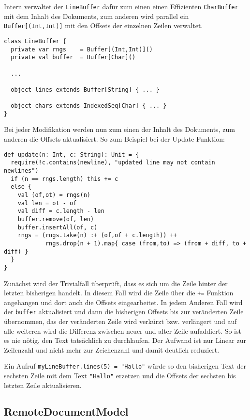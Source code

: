 Intern verwaltet der \texttt{LineBuffer} dafür zum einen einen Effizienten \texttt{CharBuffer} mit
dem Inhalt des Dokuments, zum anderen wird parallel ein \texttt{Buffer[(Int,Int)]} mit den Offsets
der einzelnen Zeilen verwaltet.

\begin{lstlisting}
class LineBuffer {
  private var rngs    = Buffer[(Int,Int)]()  
  private val buffer  = Buffer[Char]()     

  ...
    
  object lines extends Buffer[String] { ... } 
  
  object chars extends IndexedSeq[Char] { ... } 
}
\end{lstlisting}

Bei jeder Modifikation werden nun zum einen der Inhalt des Dokuments, zum anderen die Offsets
aktualisiert. So zum Beispiel bei der Update Funktion:

\begin{lstlisting}
def update(n: Int, c: String): Unit = {
  require(!c.contains(newline), "updated line may not contain newlines")
  if (n == rngs.length) this += c
  else {      
    val (of,ot) = rngs(n)
    val len = ot - of
    val diff = c.length - len
    buffer.remove(of, len)
    buffer.insertAll(of, c)
    rngs = (rngs.take(n) :+ (of,of + c.length)) ++ 
            rngs.drop(n + 1).map{ case (from,to) => (from + diff, to + diff) }
  }
}    
\end{lstlisting}

Zunächst wird der Trivialfall überprüft, dass es sich um die Zeile hinter der letzten bisherigen
handelt. In diesem Fall wird die Zeile über die \texttt{+=} Funktion angehangen und dort auch die
Offsets eingearbeitet. In jedem Anderen Fall wird der \texttt{buffer} aktualisiert und dann die
bisherigen Offsets bis zur veränderten Zeile übernommen, das der veränderten Zeile wird verkürzt
bzw. verlängert und auf alle weiteren wird die Differenz zwischen neuer und alter Zeile aufaddiert.
So ist es nie nötig, den Text tatsächlich zu durchlaufen. Der Aufwand ist nur Linear zur Zeilenzahl
und nicht mehr zur Zeichenzahl und damit deutlich reduziert.

Ein Aufruf \texttt{myLineBuffer.lines(5) = "Hallo"} würde so den bisherigen Text der sechsten Zeile
mit dem Text \texttt{"Hallo"} erzetzen und die Offsets der sechsten bis letzten Zeile aktualisieren.

\subsection{RemoteDocumentModel}


